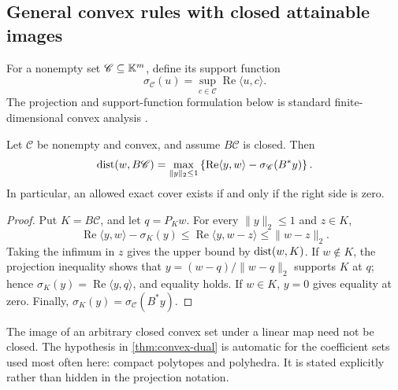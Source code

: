 \subsection{General convex rules with closed attainable images}

For a nonempty set \(\mathscr C\subseteq\mathbb K^m\), define its support
function
\[
 \sigma_{\mathscr C}(u)
 =
 \sup_{c\in\mathscr C}
 \operatorname{Re}\langle u,c\rangle.
\]
The projection and support-function formulation below is standard
finite-dimensional convex analysis
\citep{Rockafellar1970,BauschkeCombettes2017}.

\begin{theorem}
\label{thm:convex-dual}
Let \(\mathscr C\) be nonempty and convex, and assume
\(B\mathscr C\) is closed.  Then
\begin{equation}
 \operatorname{dist}(w,B\mathscr C)
 =
 \max_{\|y\|_2\le1}
 \left\{
 \operatorname{Re}\langle y,w\rangle
 -
 \sigma_{\mathscr C}(B^*y)
 \right\}.
 \label{eq:convex-distance-dual}
\end{equation}
In particular, an allowed exact cover exists if and only if the
right side is zero.
\end{theorem}

\begin{proof}
Put \(K=B\mathscr C\), and let \(q=P_Kw\).  For every
\(\|y\|_2\le1\) and \(z\in K\),
\[
 \operatorname{Re}\langle y,w\rangle-\sigma_K(y)
 \le
 \operatorname{Re}\langle y,w-z\rangle
 \le
 \|w-z\|_2.
\]
Taking the infimum in \(z\) gives the upper bound by
\(\operatorname{dist}(w,K)\).  If \(w\notin K\), the projection inequality shows
that \(y=(w-q)/\|w-q\|_2\) supports \(K\) at \(q\); hence
\(\sigma_K(y)=\operatorname{Re}\langle y,q\rangle\), and equality
holds.  If \(w\in K\), \(y=0\) gives equality at zero.  Finally,
\(\sigma_K(y)=\sigma_{\mathscr C}(B^*y)\).
\end{proof}

\begin{remark}[Closedness]
The image of an arbitrary closed convex set under a linear map need
not be closed.  The hypothesis in \cref{thm:convex-dual} is automatic
for the coefficient sets used most often here: compact polytopes and
polyhedra.  It is stated explicitly rather than hidden in the
projection notation.
\end{remark}
